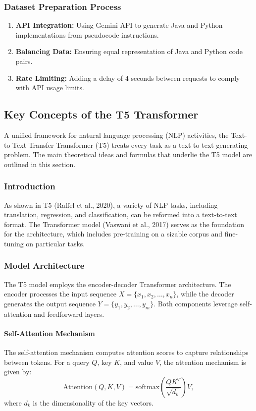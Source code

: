 \documentclass{dhbenelux}
\begin{document}
\subsubsection{Dataset Preparation Process}
\begin{enumerate}
    \item \textbf{API Integration:} Using Gemini API to generate Java and Python implementations from pseudocode instructions.
    \item \textbf{Balancing Data:} Ensuring equal representation of Java and Python code pairs.
    \item \textbf{Rate Limiting:} Adding a delay of 4 seconds between requests to comply with API usage limits.
\end{enumerate}


\subsection{Key Concepts of the T5 Transformer}

A unified framework for natural language processing (NLP) activities, the Text-to-Text Transfer Transformer (T5) treats every task as a text-to-text generating problem. The main theoretical ideas and formulas that underlie the T5 model are outlined in this section.



\subsubsection{Introduction}
As shown in T5 (Raffel et al., 2020), a variety of NLP tasks, including translation, regression, and classification, can be reformed into a text-to-text format. The Transformer model (Vaswani et al., 2017) serves as the foundation for the architecture, which includes pre-training on a sizable corpus and fine-tuning on particular tasks.

\subsubsection*{Model Architecture}
The T5 model employs the encoder-decoder Transformer architecture. The encoder processes the input sequence $X = \{x_1, x_2, \dots, x_n\}$, while the decoder generates the output sequence $Y = \{y_1, y_2, \dots, y_m\}$. Both components leverage self-attention and feedforward layers.

\paragraph{Self-Attention Mechanism}
The self-attention mechanism computes attention scores to capture relationships between tokens. For a query $Q$, key $K$, and value $V$, the attention mechanism is given by:
\begin{equation}
\text{Attention}(Q, K, V) = \text{softmax}\left(\frac{QK^T}{\sqrt{d_k}}\right)V,
\end{equation}
where $d_k$ is the dimensionality of the key vectors.
\end{document}
